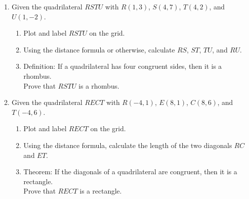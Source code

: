 \documentclass[12pt, twoside]{article}
\begin{document}
\begin{enumerate}
  \item Given the quadrilateral $RSTU$ with $R(1,3)$, $S(4,7)$, $T(4,2)$, and $U(1,-2)$.
    \begin{enumerate}
      \item Plot and label $RSTU$ on the grid.
      \item Using the distance formula or otherwise, calculate $RS$, $ST$, $TU$, and $RU$.
      \item Definition: If a quadrilateral has four congruent sides, then it is a rhombus.\\[0.5cm]
      Prove that $RSTU$ is a rhombus.
    \end{enumerate}
    \begin{center} %
    \end{center}

  \item Given the quadrilateral $RECT$ with $R(-4,1)$, $E(8,1)$, $C(8,6)$, and $T(-4,6)$.
    \begin{enumerate}
      \item Plot and label $RECT$ on the grid.
      \item Using the distance formula, calculate the length of the two diagonals $RC$ and $ET$.
      \item Theorem: If the diagonals of a quadrilateral are congruent, then it is a rectangle.\\[0.5cm]
      Prove that $RECT$ is a rectangle.
    \end{enumerate}
    \begin{center} %
    \end{center}

  \end{enumerate}
\end{document}
